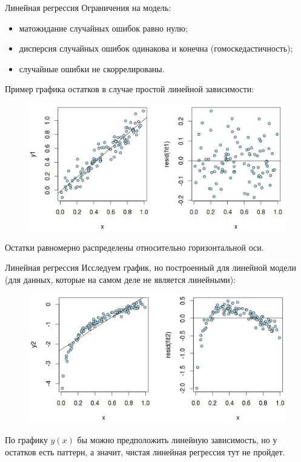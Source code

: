 \documentclass{beamer}
\begin{document}
\begin{frame}{Линейная регрессия}
Ограничения на модель:
\begin{itemize}
\item матожидание случайных ошибок равно нулю;
\item дисперсия случайных ошибок одинакова и конечна (гомоскедастичность);
\item случайные ошибки не скоррелированы.
\end{itemize}
Пример графика остатков в случае простой линейной зависимости:
\begin{figure}[h]
\centering
\includegraphics[scale=0.4]{images/error-01.png}
\end{figure}
Остатки равномерно распределены относительно горизонтальной оси.
\end{frame}

\begin{frame}{Линейная регрессия}
Исследуем график, но построенный для линейной модели (для данных, которые на самом деле не является линейными):
\begin{figure}[h]
\centering
\includegraphics[scale=0.5]{images/error-02.png}
\end{figure}
По графику $y(x)$ бы можно предположить линейную зависимость, но у остатков есть паттерн, а значит, чистая линейная регрессия тут не пройдет. 
\end{frame}
\end{document}
